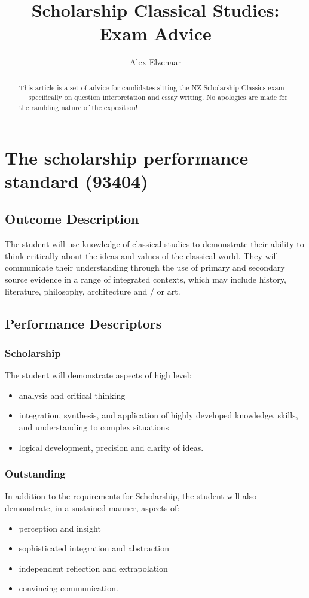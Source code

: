 \documentclass[a4paper,10pt]{article}
\title{Scholarship Classical Studies: Exam Advice}
\author{Alex Elzenaar}
\begin{document}
\maketitle
\begin{abstract}
  This article is a set of advice for candidates sitting the NZ Scholarship Classics exam --- specifically
  on question interpretation and essay writing. No apologies are made for the rambling nature of the exposition!
\end{abstract}

\tableofcontents

\section{The scholarship performance standard (93404)}
\subsection{Outcome Description}
The student will use knowledge of classical studies to demonstrate their ability to think critically about the ideas and values of the classical world. They will communicate their understanding through the use of primary and secondary source evidence in a range of integrated contexts, which may include history, literature, philosophy, architecture and / or art.

\subsection{Performance Descriptors}
\subsubsection{Scholarship}
The student will demonstrate aspects of high level:
\begin{itemize}
  \item analysis and critical thinking
  \item integration, synthesis, and application of highly developed knowledge, skills, and understanding to complex situations
  \item logical development, precision and clarity of ideas.
\end{itemize}

\subsubsection{Outstanding}
In addition to the requirements for Scholarship, the student will also demonstrate, in a sustained manner, aspects of:
\begin{itemize}
  \item perception and insight
  \item sophisticated integration and abstraction
  \item independent reflection and extrapolation
  \item convincing communication.
\end{itemize}
\end{document}
